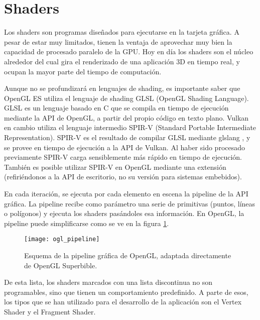 \section{Shaders}
\label{shaders}

Los shaders son programas diseñados para ejecutarse en la tarjeta gráfica. A pesar de estar muy limitados, tienen la ventaja de aprovechar muy bien la capacidad de procesado paralelo de la GPU. Hoy en día los shaders son el núcleo alrededor del cual gira el renderizado de una aplicación 3D en tiempo real, y ocupan la mayor parte del tiempo de computación.

Aunque no se profundizará en lenguajes de shading, es importante saber que OpenGL ES utiliza el lenguaje de shading GLSL (OpenGL Shading Language). GLSL es un lenguaje basado en C que se compila en tiempo de ejecución mediante la API de OpenGL, a partir del propio código en texto plano. Vulkan en cambio utiliza el lenguaje intermedio SPIR-V (Standard Portable Intermediate Representation). SPIR-V es el resultado de compilar GLSL mediante glslang , y se provee en tiempo de ejecución a la API de Vulkan. Al haber sido procesado previamente SPIR-V carga sensiblemente más rápido en tiempo de ejecución. También es posible utilizar SPIR-V en OpenGL mediante una extensión (refiriéndonos a la API de escritorio, no su versión para sistemas embebidos).

En cada iteración, se ejecuta por cada elemento en escena la pipeline de la API gráfica. La pipeline recibe como parámetro una serie de primitivas (puntos, líneas o polígonos) y ejecuta los shaders pasándoles esa información. En OpenGL, la pipeline puede simplificarse como se ve en la figura \ref{fig:opengl_pipeline}.

\begin{figure}[H]
    \centering
    \texttt{[image: ogl\_pipeline]}
    \caption{Esquema de la pipeline gráfica de OpenGL, adaptada directamente de OpenGL Superbible.}
    \label{fig:opengl_pipeline}
\end{figure}

De esta lista, los shaders marcados con una lista discontinua no son programables, sino que tienen un comportamiento predefinido. A parte de esos, los tipos que se han utilizado para el desarrollo de la aplicación son el Vertex Shader y el Fragment Shader.

